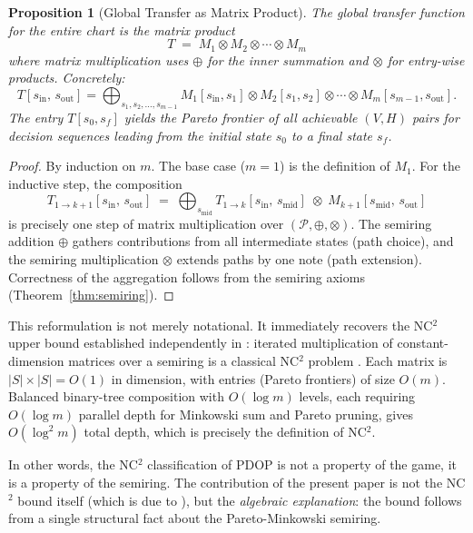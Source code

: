 \documentclass[11pt, letterpaper]{article}
\newtheorem{proposition}[theorem]{Proposition}
\theoremstyle{definition}
\theoremstyle{remark}
\begin{document}
\begin{proposition}[Global Transfer as Matrix Product]
\label{prop:matrix-product}
The global transfer function for the entire chart is the matrix product
\begin{equation}
    T \;=\; M_1 \otimes M_2 \otimes \cdots \otimes M_m
\end{equation}
where matrix multiplication uses $\oplus$ for the inner summation and $\otimes$ for entry-wise products.
Concretely:
\[
    T[s_{\mathrm{in}},\, s_{\mathrm{out}}]
    = \bigoplus_{s_1, s_2, \ldots, s_{m-1}}
    M_1[s_{\mathrm{in}}, s_1] \otimes M_2[s_1, s_2] \otimes \cdots \otimes M_m[s_{m-1}, s_{\mathrm{out}}].
\]
The entry $T[s_0, s_f]$ yields the Pareto frontier of all achievable $(V, H)$ pairs for decision sequences leading from the initial state $s_0$ to a final state $s_f$.
\end{proposition}

\begin{proof}
By induction on $m$.
The base case ($m = 1$) is the definition of $M_1$.
For the inductive step, the composition
\[
    T_{1 \to k+1}[s_{\mathrm{in}},\, s_{\mathrm{out}}]
    \;=\; \bigoplus_{s_{\mathrm{mid}}} T_{1 \to k}[s_{\mathrm{in}},\, s_{\mathrm{mid}}] \;\otimes\; M_{k+1}[s_{\mathrm{mid}},\, s_{\mathrm{out}}]
\]
is precisely one step of matrix multiplication over $(\mathcal{P}, \oplus, \otimes)$.
The semiring addition $\oplus$ gathers contributions from all intermediate states (path choice), and the semiring multiplication $\otimes$ extends paths by one note (path extension).
Correctness of the aggregation follows from the semiring axioms (Theorem~\ref{thm:semiring}).
\end{proof}

This reformulation is not merely notational.
It immediately recovers the NC$^2$ upper bound established independently in \cite[\S4.5]{Chang2026}: iterated multiplication of constant-dimension matrices over a semiring is a classical NC$^2$ problem \cite{Cook1985, AroraBarak2009}.
Each matrix is $|S| \times |S| = O(1)$ in dimension, with entries (Pareto frontiers) of size $O(m)$.
Balanced binary-tree composition with $O(\log m)$ levels, each requiring $O(\log m)$ parallel depth for Minkowski sum and Pareto pruning, gives $O(\log^2 m)$ total depth, which is precisely the definition of NC$^2$.

In other words, the NC$^2$ classification of PDOP is not a property of the game, it is a property of the semiring.
The contribution of the present paper is not the NC$^2$ bound itself (which is due to \cite{Chang2026}), but the \emph{algebraic explanation}: the bound follows from a single structural fact about the Pareto-Minkowski semiring.
\end{document}
